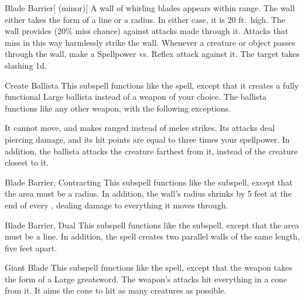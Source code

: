 \begin{ability}[\nth{2}]{Blade Barrier}[ (minor)]
A wall of whirling blades appears within \rngmed range.
The wall either takes the form of a \arealarge line or a \areasmall radius.
In either case, it is 20 ft.\ high.
The wall provides  (20\% miss chance) against attacks made through it.
Attacks that miss in this way harmlessly strike the wall.
Whenever a creature or object passes through the wall, make a Spellpower vs. Reflex attack against it.
\hit The target takes slashing  \minus1d.
\end{ability}
\vspace{0.25em}


\begin{ability}[\nth{3}]{Create Ballista}
This subspell functions like the  spell, except that it creates a fully functional Large ballista instead of a weapon of your choice.
The ballista functions like any other weapon, with the following exceptions.

It cannot move, and makes ranged  instead of melee strikes.
Its attacks deal piercing damage, and its hit points are equal to three times your spellpower.
In addition, the ballista attacks the creature farthest from it, instead of the creature closest to it.
\end{ability}
\vspace{0.25em}


\begin{ability}[\nth{4}]{Blade Barrier, Contracting}
This subspell functions like the  subspell, except that the area must be a radius.
In addition, the wall's radius shrinks by 5 feet at the end of every , dealing damage to everything it moves through.
\end{ability}
\vspace{0.25em}


\begin{ability}[\nth{4}]{Blade Barrier, Dual}
This subspell functions like the  subspell, except that the area must be a line.
In addition, the spell creates two parallel walls of the same length, five feet apart.
\end{ability}
\vspace{0.25em}


\begin{ability}[\nth{4}]{Giant Blade}
This subspell functions like the  spell, except that the weapon takes the form of a Large greatsword.
The weapon's attacks hit everything in a \areasmall cone from it.
It aims the cone to hit as many creatures as possible.
\end{ability}
\vspace{0.25em}


